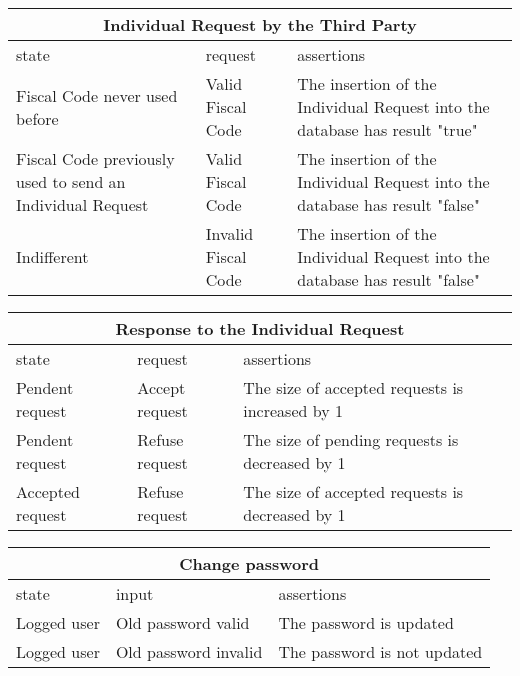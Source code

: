 \begin{center}
	\begin{tabular}{|p{}|p{}|p{}|}
		\hline
		\multicolumn{3}{c}{Individual Request by the Third Party}\\
		\hline
		state & request & assertions \\
		\hline
		Fiscal Code never used before &
		Valid Fiscal Code &
		 The insertion of the Individual Request into the database has result "true"\newline
		\\
		\hline
		Fiscal Code previously used to send an Individual Request&
		Valid Fiscal Code &
		The insertion of the Individual Request into the database has result "false" \newline
		\\
		\hline
		Indifferent&
		Invalid Fiscal Code &
		The insertion of the Individual Request into the database has result "false" \newline
		\\
		\hline
		
	\end{tabular}
\end{center}

\begin{center}
	\begin{tabular}{|p{}|p{}|p{}|}
		\hline
		\multicolumn{3}{c}{Response to the Individual Request}\\
		\hline
		state & request & assertions \\
		\hline
		Pendent request& 
		Accept request &
		The size of accepted requests is increased by 1 \newline
		\\
		\hline
		Pendent request& 
		Refuse request &
		The size of pending requests is decreased by 1 \newline
		\\
		\hline
		Accepted request & 
		Refuse request &
		The size of accepted requests is decreased by 1 \newline
		\\
	\end{tabular}
\end{center}

\begin{center}
	\begin{tabular}{|p{}|p{}|p{}|}
		\hline
		\multicolumn{3}{c}{Change password}\\
		\hline
		state & input & assertions \\
		\hline
		Logged user &
		Old password valid& 
		The password is updated \newline
		\\
		\hline
		Logged user &
		Old password invalid& 
		The password is not updated \newline
		\\
		\hline
	\end{tabular}
\end{center}


